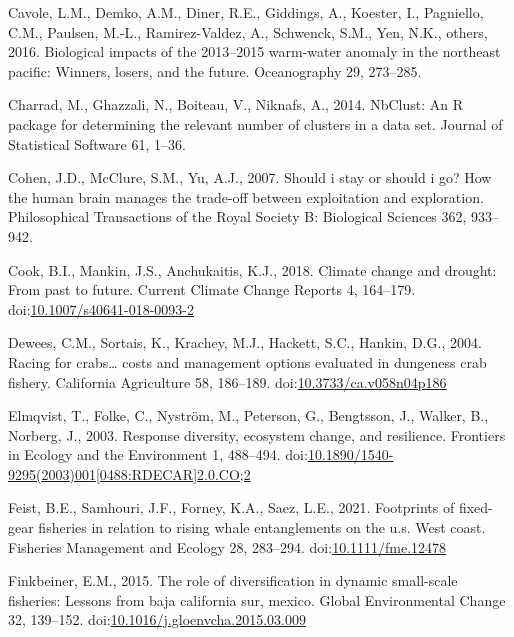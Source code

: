 \documentclass[]{elsarticle} %
\begin{document}
\leavevmode\hypertarget{ref-Cavole2016}{}%
Cavole, L.M., Demko, A.M., Diner, R.E., Giddings, A., Koester, I.,
Pagniello, C.M., Paulsen, M.-L., Ramirez-Valdez, A., Schwenck, S.M.,
Yen, N.K., others, 2016. Biological impacts of the 2013--2015 warm-water
anomaly in the northeast pacific: Winners, losers, and the future.
Oceanography 29, 273--285.

\leavevmode\hypertarget{ref-nbclust2014}{}%
Charrad, M., Ghazzali, N., Boiteau, V., Niknafs, A., 2014. NbClust: An R
package for determining the relevant number of clusters in a data set.
Journal of Statistical Software 61, 1--36.

\leavevmode\hypertarget{ref-Cohen2007}{}%
Cohen, J.D., McClure, S.M., Yu, A.J., 2007. Should i stay or should i
go? How the human brain manages the trade-off between exploitation and
exploration. Philosophical Transactions of the Royal Society B:
Biological Sciences 362, 933--942.

\leavevmode\hypertarget{ref-Cook2018}{}%
Cook, B.I., Mankin, J.S., Anchukaitis, K.J., 2018. Climate change and
drought: From past to future. Current Climate Change Reports 4,
164--179.
doi:\href{https://doi.org/10.1007/s40641-018-0093-2}{10.1007/s40641-018-0093-2}

\leavevmode\hypertarget{ref-Dewees2004}{}%
Dewees, C.M., Sortais, K., Krachey, M.J., Hackett, S.C., Hankin, D.G.,
2004. Racing for crabs\ldots{} costs and management options evaluated in
dungeness crab fishery. California Agriculture 58, 186--189.
doi:\href{https://doi.org/10.3733/ca.v058n04p186}{10.3733/ca.v058n04p186}

\leavevmode\hypertarget{ref-Elmqvist2003a}{}%
Elmqvist, T., Folke, C., Nyström, M., Peterson, G., Bengtsson, J.,
Walker, B., Norberg, J., 2003. Response diversity, ecosystem change, and
resilience. Frontiers in Ecology and the Environment 1, 488--494.
doi:\href{https://doi.org/10.1890/1540-9295(2003)001\%5B0488:RDECAR\%5D2.0.CO;2}{10.1890/1540-9295(2003)001{[}0488:RDECAR{]}2.0.CO;2}

\leavevmode\hypertarget{ref-Feist2021}{}%
Feist, B.E., Samhouri, J.F., Forney, K.A., Saez, L.E., 2021. Footprints
of fixed-gear fisheries in relation to rising whale entanglements on the
u.s. West coast. Fisheries Management and Ecology 28, 283--294.
doi:\href{https://doi.org/10.1111/fme.12478}{10.1111/fme.12478}

\leavevmode\hypertarget{ref-Finkbeiner2015}{}%
Finkbeiner, E.M., 2015. The role of diversification in dynamic
small-scale fisheries: Lessons from baja california sur, mexico. Global
Environmental Change 32, 139--152.
doi:\href{https://doi.org/10.1016/j.gloenvcha.2015.03.009}{10.1016/j.gloenvcha.2015.03.009}
\end{document}
